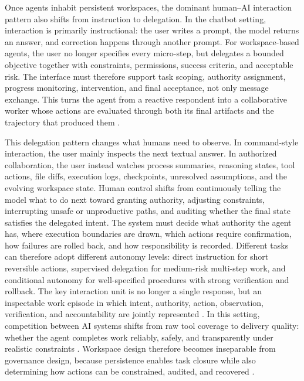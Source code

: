 Once agents inhabit persistent workspaces, the dominant human--AI interaction pattern also shifts from instruction to delegation.
In the chatbot setting, interaction is primarily instructional: the user writes a prompt, the model returns an answer, and correction happens through another prompt.
For workspace-based agents, the user no longer specifies every micro-step, but delegates a bounded objective together with constraints, permissions, success criteria, and acceptable risk.
The interface must therefore support task scoping, authority assignment, progress monitoring, intervention, and final acceptance, not only message exchange.
This turns the agent from a reactive respondent into a collaborative worker whose actions are evaluated through both its final artifacts and the trajectory that produced them \citep{xie2024osworld,drouin2024workarena,theagentcompany2024,marro2025permission}.

This delegation pattern changes what humans need to observe.
In command-style interaction, the user mainly inspects the next textual answer.
In authorized collaboration, the user instead watches process summaries, reasoning states, tool actions, file diffs, execution logs, checkpoints, unresolved assumptions, and the evolving workspace state.
Human control shifts from continuously telling the model what to do next toward granting authority, adjusting constraints, interrupting unsafe or unproductive paths, and auditing whether the final state satisfies the delegated intent.
The system must decide what authority the agent has, where execution boundaries are drawn, which actions require confirmation, how failures are rolled back, and how responsibility is recorded.
Different tasks can therefore adopt different autonomy levels: direct instruction for short reversible actions, supervised delegation for medium-risk multi-step work, and conditional autonomy for well-specified procedures with strong verification and rollback.
The key interaction unit is no longer a single response, but an inspectable work episode in which intent, authority, action, observation, verification, and accountability are jointly represented \citep{openclaw2026repo,wang2024openhands,li2026prism,zhao2026clawguard,gruber2026agenticforensics}.
In this setting, competition between AI systems shifts from raw tool coverage to delivery quality: whether the agent completes work reliably, safely, and transparently under realistic constraints \cite{reliability2026computeruse,rabanser2026sciencereliability,rosset2026verifiers}.
Workspace design therefore becomes inseparable from governance design, because persistence enables task closure while also determining how actions can be constrained, audited, and recovered \cite{wang2026openclawsec,li2026prism,zhao2026clawguard,gruber2026agenticforensics}.

